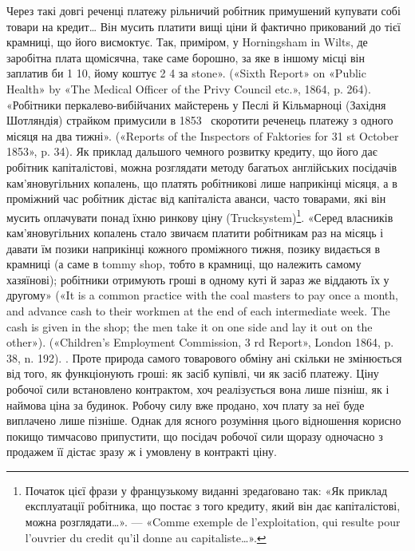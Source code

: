 {Через такі довгі реченці платежу рільничий робітник примушений купувати
собі товари на кредит\dots{} Він мусить платити вищі ціни й фактично
прикований до тієї крамниці, що його висмоктує. Так, приміром, у Horningsham
in Wilts, де заробітна плата щомісячна, таке саме борошно, за
яке в іншому місці він заплатив би 1 10, йому коштує 2
4 за stone». («Sixth Report» on «Public Health» by «The
Medical Officer of the Privy Council etc.», 1864, p. 264). «Робітники перкалево-вибійчаних
майстерень у Песлі й Кільмарноці (Західня Шотляндія)
страйком примусили в 1853~ скоротити реченець платежу з одного
місяця на два тижні». («Reports of the Inspectors of Faktories for 31 st
October 1853», p. 34). Як приклад дальшого чемного розвитку кредиту,
що його дає робітник капіталістові, можна розглядати методу багатьох
англійських посідачів кам’яновугільних копалень, що платять робітникові
лише наприкінці місяця, а в проміжний час робітник дістає від капіталіста
аванси, часто товарами, які він мусить оплачувати понад їхню
ринкову ціну (Trucksystem)\footnote*{
Початок цієї фрази у французькому виданні зредаґовано так: «Як
приклад експлуатації робітника, що постає з того кредиту, який він дає
капіталістові, можна розглядати\dots{}». — «Comme exemple de l’exploitation,
qui resulte pour l’ouvrier du credit qu’il donne au capitaliste\dots{}». \Red
}.
«Серед власників кам’яновугільних копалень
стало звичаєм платити робітникам раз на місяць і давати їм позики
наприкінці кожного проміжного тижня, позику видається в крамниці
(а саме в tommy shop, тобто в крамниці, що належить самому хазяїнові);
робітники отримують гроші в одному куті й зараз же віддають їх у другому»
(«It is a common practice with the coal masters to pay once a month,
and advance cash to their workmen at the end of each intermediate week.
The cash is given in the shop; the men take it on one side and lay it out on
the other»). («Children’s Employment Commission, 3 rd Report», London
1864, p. 38, n. 192).
}.
Проте природа самого товарового
обміну ані скільки не змінюється від того, як функціонують
гроші: як засіб купівлі, чи як засіб платежу. Ціну робочої сили
встановлено контрактом, хоч реалізується вона лише пізніш,
як і наймова ціна за будинок. Робочу силу вже продано, хоч
плату за неї буде виплачено лише пізніше. Однак для ясного розуміння
цього відношення корисно покищо тимчасово припустити,
що посідач робочої сили щоразу одночасно з продажем її дістає
зразу ж і умовлену в контракті ціну.

